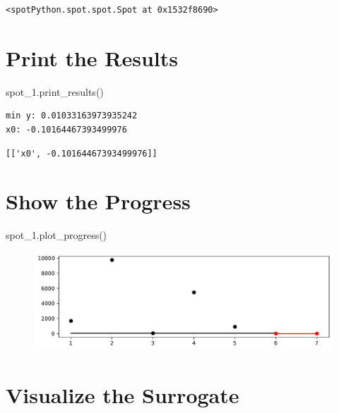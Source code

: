 \documentclass[
  letterpaper,
  DIV=11,
  numbers=noendperiod]{scrreprt}
\newenvironment{Shaded}{\begin{snugshade}}{\end{snugshade}}
\newcommand{\NormalTok}[1]{\textcolor[rgb]{0.00,0.23,0.31}{#1}}
\begin{document}
\begin{verbatim}
<spotPython.spot.spot.Spot at 0x1532f8690>
\end{verbatim}

\hypertarget{print-the-results-5}{%
\section{Print the Results}\label{print-the-results-5}}

\begin{Shaded}
\begin{Highlighting}[]
\NormalTok{spot\_1.print\_results()}
\end{Highlighting}
\end{Shaded}

\begin{verbatim}
min y: 0.01033163973935242
x0: -0.10164467393499976
\end{verbatim}

\begin{verbatim}
[['x0', -0.10164467393499976]]
\end{verbatim}

\hypertarget{show-the-progress-2}{%
\section{Show the Progress}\label{show-the-progress-2}}

\begin{Shaded}
\begin{Highlighting}[]
\NormalTok{spot\_1.plot\_progress()}
\end{Highlighting}
\end{Shaded}

\begin{figure}[H]

{\centering \includegraphics{a_04_spot_doc_files/figure-pdf/cell-8-output-1.pdf}

}

\end{figure}

\hypertarget{visualize-the-surrogate}{%
\section{Visualize the Surrogate}\label{visualize-the-surrogate}}
\end{document}
